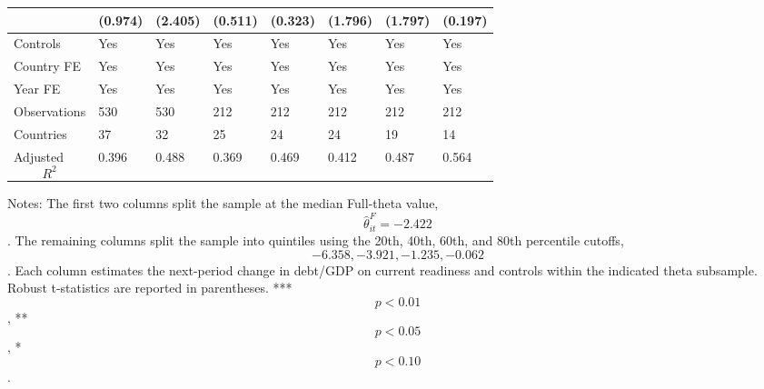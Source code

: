 \begin{table}[H]
\begin{threeparttable}
\begin{tabularx}{\textwidth}{lYYYYYYY}
  & (0.974) & (2.405) & (0.511) & (0.323) & (1.796) & (1.797) & (0.197) \\
\midrule
Controls & Yes & Yes & Yes & Yes & Yes & Yes & Yes \\
Country FE & Yes & Yes & Yes & Yes & Yes & Yes & Yes \\
Year FE & Yes & Yes & Yes & Yes & Yes & Yes & Yes \\
Observations & 530 & 530 & 212 & 212 & 212 & 212 & 212 \\
Countries & 37 & 32 & 25 & 24 & 24 & 19 & 14 \\
Adjusted $$R^2$$ & 0.396 & 0.488 & 0.369 & 0.469 & 0.412 & 0.487 & 0.564 \\
\bottomrule
\end{tabularx}
\begin{tablenotes}[flushleft]\footnotesize
\item Notes: The first two columns split the sample at the median Full-theta value, $$\widehat{\theta}^{F}_{it}=-2.422$$. The remaining columns split the sample into quintiles using the 20th, 40th, 60th, and 80th percentile cutoffs, $$-6.358, -3.921, -1.235, -0.062$$. Each column estimates the next-period change in debt/GDP on current readiness and controls within the indicated theta subsample. Robust t-statistics are reported in parentheses. *** $$p<0.01$$, ** $$p<0.05$$, * $$p<0.10$$.
\end{tablenotes}
\end{threeparttable}
\end{table}
